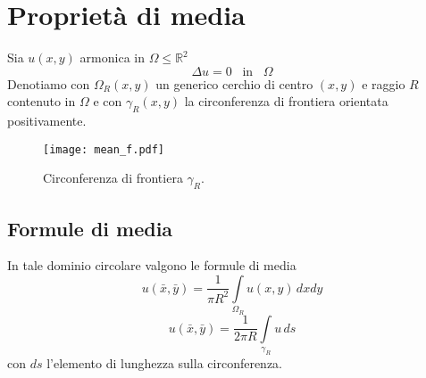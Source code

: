 \section{Propriet\`a di media}
Sia $u(x,y)$ armonica in $\Omega \leq \mathbb{R}^2$
\[
	\Delta u= 0 \;\;\; \text{in} \;\;\; \Omega
\]
Denotiamo con $\Omega_R(x,y)$ un generico cerchio di centro $(x,y)$ e raggio
$R$ contenuto in $\Omega$ e con $\gamma_R(x,y)$ la circonferenza di frontiera
orientata positivamente.
\begin{figure}[H]
	\centering
	\texttt{[image: mean\_f.pdf]}
	\caption{Circonferenza di frontiera $\gamma_R$.}
	\label{mean_f}
\end{figure}
\noindent
\subsection{Formule di media}
In tale dominio circolare valgono le formule di media
\[
	u(\bar{x}, \bar{y})= \frac{1}{\pi R^2}
	\int \limits_{\Omega_R}
	u(x,y) \, dxdy
\]
\[
	u(\bar{x}, \bar{y})= \frac{1}{2 \pi R}
	\int \limits_{\gamma_R}
	u \, ds
\]
con $ds$ l'elemento di lunghezza sulla circonferenza.
